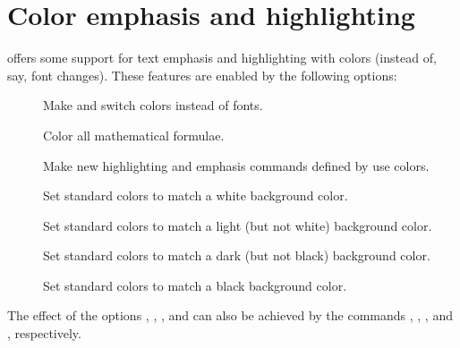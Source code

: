   \section{Color emphasis and highlighting}\label{Sec:ColorEmphasis}
   offers some support for text emphasis and highlighting with colors (instead of, say, font
  changes). These features are enabled by the following options:
  \begin{description}
  \item[] Make  and  switch colors instead of fonts.

  \item[] Color all mathematical formulae.
    
  \item[] Make new highlighting and emphasis commands defined by 
    use colors.

    \newslide

  \item[] Set standard colors to match a white background color.

  \item[] Set standard colors to match a light (but not white) background color.

  \item[] Set standard colors to match a dark (but not black) background color.

  \item[] Set standard colors to match a black background color.
  \end{description}
  
  The effect of the options , , , and
   can also be achieved by the commands , ,
  , and , respectively.
  
